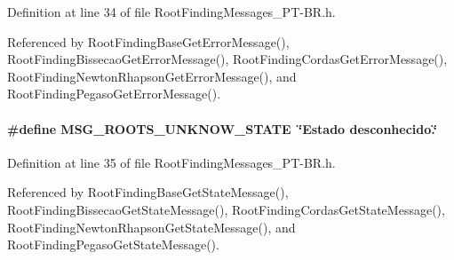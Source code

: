 Definition at line 34 of file RootFindingMessages\_\-PT-BR.h.

Referenced by RootFindingBaseGetErrorMessage(), RootFindingBissecaoGetErrorMessage(), RootFindingCordasGetErrorMessage(), RootFindingNewtonRhapsonGetErrorMessage(), and RootFindingPegasoGetErrorMessage().\hypertarget{group____messages_gf33ab54fcaa61fcc47cb9c5dece317e2}{
\paragraph[MSG\_\-ROOTS\_\-UNKNOW\_\-STATE]{\setlength{\rightskip}{0pt plus 5cm}\#define MSG\_\-ROOTS\_\-UNKNOW\_\-STATE~\char`\"{}Estado desconhecido.\char`\"{}}\hfill}
\label{group____messages_gf33ab54fcaa61fcc47cb9c5dece317e2}




Definition at line 35 of file RootFindingMessages\_\-PT-BR.h.

Referenced by RootFindingBaseGetStateMessage(), RootFindingBissecaoGetStateMessage(), RootFindingCordasGetStateMessage(), RootFindingNewtonRhapsonGetStateMessage(), and RootFindingPegasoGetStateMessage().